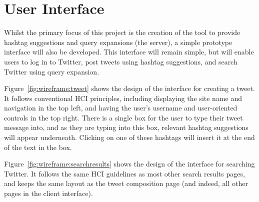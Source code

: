 \documentclass[11pt,a4paper]{report}
\begin{document}
\section{User Interface}
Whilst the primary focus of this project is the creation of the tool to provide hashtag suggestions and query expansions (the server), a simple prototype interface will also be developed. This interface will remain simple, but will enable users to log in to Twitter, post tweets using hashtag suggestions, and search Twitter using query expansion.

Figure~\autoref{fig:wireframe:tweet} shows the design of the interface for creating a tweet. It follows conventional HCI principles, including displaying the site name and navigation in the top left, and having the user's username and user-oriented controls in the top right. There is a single box for the user to type their tweet message into, and as they are typing into this box, relevant hashtag suggestions will appear underneath. Clicking on one of these hashtags will insert it at the end of the text in the box.

Figure~\autoref{fig:wireframe:searchresults} shows the design of the interface for searching Twitter. It follows the same HCI guidelines as most other search results pages, and keeps the same layout as the tweet composition page (and indeed, all other pages in the client interface).
\end{document}
